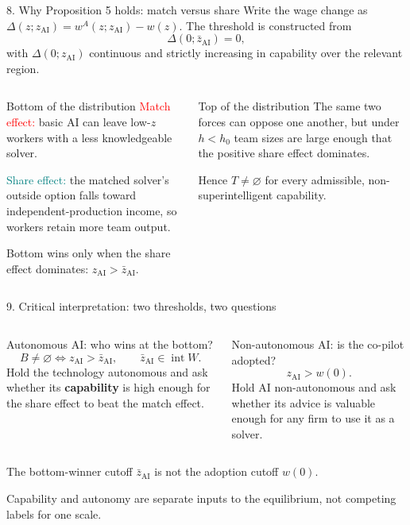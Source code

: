 \documentclass[aspectratio=169,11pt]{beamer}
\newcommand{\zAI}{z_{\mathrm{AI}}}
\newcommand{\zbAI}{\bar z_{\mathrm{AI}}}
\newcommand{\wA}{w^{A}}
\begin{document}
\begin{frame}{8. Why Proposition 5 holds: match versus share}
  Write the wage change as $\Delta(z;\zAI)=\wA(z;\zAI)-w(z)$. The threshold is constructed from
  \[
    \Delta(0;\zbAI)=0,
  \]
  with $\Delta(0;\zAI)$ continuous and strictly increasing in capability over the relevant region.

  \begin{columns}[T,onlytextwidth]
      \begin{block}{Bottom of the distribution}
      \small
      \textcolor{red}{Match effect:} basic AI can leave low-$z$ workers with a less knowledgeable solver.\par\smallskip
      \textcolor{teal}{Share effect:} the matched solver's outside option falls toward independent-production income, so workers retain more team output.\par\smallskip
      Bottom wins only when the share effect dominates: $\zAI>\zbAI$.
      \end{block}
      \begin{block}{Top of the distribution}
      \small
      The same two forces can oppose one another, but under $h<h_0$ team sizes are large enough that the positive share effect dominates.\par\smallskip
      Hence $T\ne\varnothing$ for every admissible, non-superintelligent capability.
      \end{block}
  \end{columns}
\end{frame}

\begin{frame}{9. Critical interpretation: two thresholds, two questions}
  \begin{columns}[T,onlytextwidth]
      \begin{block}{Autonomous AI: who wins at the bottom?}
        \[
          B\ne\varnothing\iff\zAI>\zbAI,
          \qquad \zbAI\in\operatorname{int}W.
        \]
        \small
        Hold the technology autonomous and ask whether its \textbf{capability} is high enough for the share effect to beat the match effect.
      \end{block}
      \begin{block}{Non-autonomous AI: is the co-pilot adopted?}
        \[
          \zAI>w(0).
        \]
        \small
        Hold AI non-autonomous and ask whether its advice is valuable enough for any firm to use it as a solver.
      \end{block}
  \end{columns}

  \medskip
  \centering
  \alert{The bottom-winner cutoff $\zbAI$ is not the adoption cutoff $w(0)$.}\par
  \smallskip
  Capability and autonomy are separate inputs to the equilibrium, not competing labels for one scale.
\end{frame}
\end{document}
